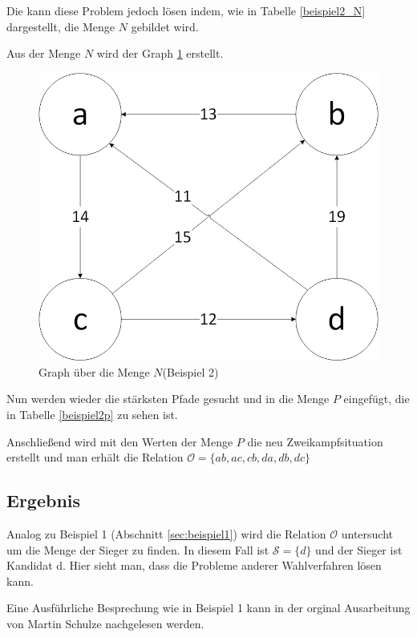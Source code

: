 Die \schulze kann diese Problem jedoch lösen indem, wie in Tabelle \ref{beispiel2_N} dargestellt, die Menge $N$ gebildet wird.



Aus der Menge $N$ wird der Graph \ref{fig:graph2} erstellt.

\begin{figure}[!h]
\centering
\includegraphics[scale=0.5]{Bilder/Beispiel2_Graph.png}
\caption{Graph über die Menge $N$(Beispiel 2)}
\label{fig:graph2}
\end{figure}

Nun werden wieder die stärksten Pfade gesucht und in die Menge $P$ eingefügt, die in Tabelle \ref{beispiel2p} zu sehen ist.



Anschließend wird mit den Werten der Menge $P$ die neu Zweikampfsituation erstellt und man erhält die Relation $\mathcal{O} = \{ ab,ac,cb,da,db,dc \}$


\subsection{Ergebnis} 
\label{sec:ergebnis2}
Analog zu Beispiel 1 (Abschnitt \ref{sec:beispiel1}) wird die Relation $\mathcal{O}$ untersucht um die Menge der Sieger zu finden. In diesem Fall ist $\mathcal{S}=\{d\}$  und der Sieger ist Kandidat d. Hier sieht man, dass die \schulze Probleme anderer Wahlverfahren lösen kann.

Eine Ausführliche Besprechung wie in Beispiel 1 kann in der orginal Ausarbeitung von Martin Schulze nachgelesen werden. \citep{Schulze2017}
